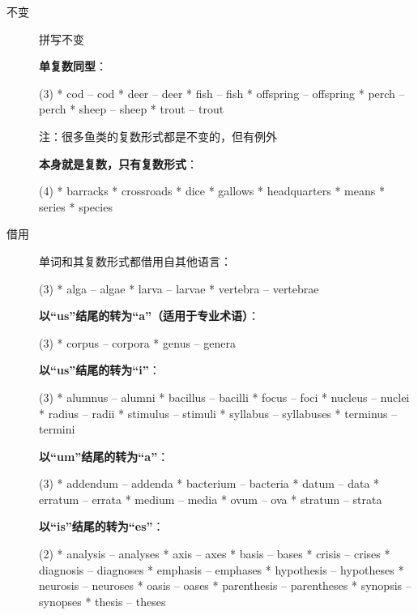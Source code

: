 \begin{description}
\item [不变] 拼写不变

  \textbf{单复数同型}：
  \begin{taskitem}(3)
    *  cod -- cod
    *  deer -- deer
    *  fish -- fish
    *  offspring -- offspring
    *  perch -- perch
    *  sheep -- sheep
    *  trout -- trout
  \end{taskitem}

  注：很多鱼类的复数形式都是不变的，但有例外

  \textbf{本身就是复数，只有复数形式}：
  \begin{taskitem}(4)
    *  barracks
    *  crossroads
    *  dice
    *  gallows
    *  headquarters
    *  means
    *  series
    *  species
  \end{taskitem}

\item[借用] 单词和其复数形式都借用自其他语言：

  \begin{taskitem}(3)
    *  alga -- algae
    *  larva -- larvae
    *  vertebra -- vertebrae
  \end{taskitem}

  \textbf{以``us''结尾的转为``a''（适用于专业术语）}：
  \begin{taskitem}(3)
    *  corpus -- corpora
    *  genus -- genera
  \end{taskitem}

  \textbf{以``us''结尾的转为``i''}：
  \begin{taskitem}(3)
    *  alumnus -- alumni
    *  bacillus -- bacilli
    *  focus -- foci
    *  nucleus -- nuclei
    *  radius -- radii
    *  stimulus -- stimuli
    *  syllabus -- syllabuses
    *  terminus -- termini
  \end{taskitem}

  \textbf{以``um''结尾的转为``a''}：
  \begin{taskitem}(3)
    *  addendum -- addenda
    *  bacterium -- bacteria
    *  datum -- data
    *  erratum -- errata
    *  medium -- media
    *  ovum -- ova
    *  stratum -- strata
  \end{taskitem}

  \textbf{以``is''结尾的转为``es''}：
  \begin{taskitem}(2)
    *  analysis -- analyses
    *  axis -- axes
    *  basis -- bases
    *  crisis -- crises
    *  diagnosis -- diagnoses
    *  emphasis -- emphases
    *  hypothesis -- hypotheses
    *  neurosis -- neuroses
    *  oasis -- oases
    *  parenthesis -- parentheses
    *  synopsis -- synopses
    *  thesis -- theses
  \end{taskitem}



\end{description}

